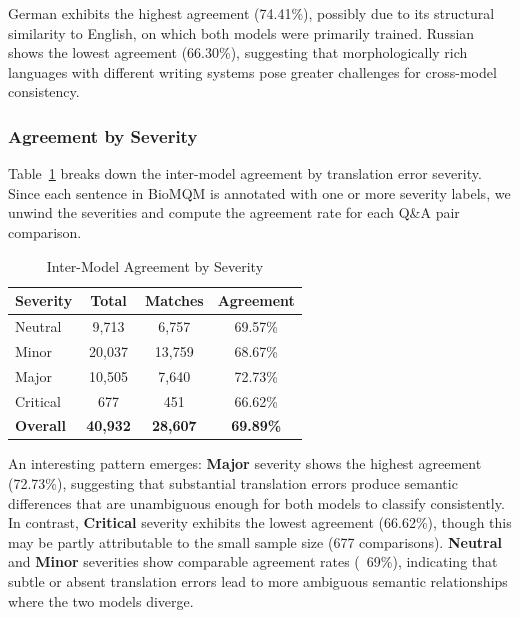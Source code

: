     German exhibits the highest agreement (74.41\%), possibly due to its structural similarity to English, on which both models were primarily trained. Russian shows the lowest agreement (66.30\%), suggesting that morphologically rich languages with different writing systems pose greater challenges for cross-model consistency.

    \subsubsection{Agreement by Severity}
    \label{sec:agreement_severity}

    Table~\ref{tab:agreement_severity} breaks down the inter-model agreement by translation error severity. Since each sentence in BioMQM is annotated with one or more severity labels, we unwind the severities and compute the agreement rate for each Q\&A pair comparison.

    \begin{table}[htbp]
    \centering
    \caption{Inter-Model Agreement by Severity}
    \label{tab:agreement_severity}
    \begin{tabular}{lccc}
    \hline
    \textbf{Severity} & \textbf{Total} & \textbf{Matches} & \textbf{Agreement} \\
    \hline
    Neutral  & 9,713  & 6,757  & 69.57\% \\
    Minor    & 20,037 & 13,759 & 68.67\% \\
    Major    & 10,505 & 7,640  & 72.73\% \\
    Critical & 677    & 451    & 66.62\% \\
    \hline
    \textbf{Overall} & \textbf{40,932} & \textbf{28,607} & \textbf{69.89\%} \\
    \hline
    \end{tabular}
    \end{table}

    An interesting pattern emerges: \textbf{Major} severity shows the highest agreement (72.73\%), suggesting that substantial translation errors produce semantic differences that are unambiguous enough for both models to classify consistently. In contrast, \textbf{Critical} severity exhibits the lowest agreement (66.62\%), though this may be partly attributable to the small sample size (677 comparisons). \textbf{Neutral} and \textbf{Minor} severities show comparable agreement rates (~69\%), indicating that subtle or absent translation errors lead to more ambiguous semantic relationships where the two models diverge.

